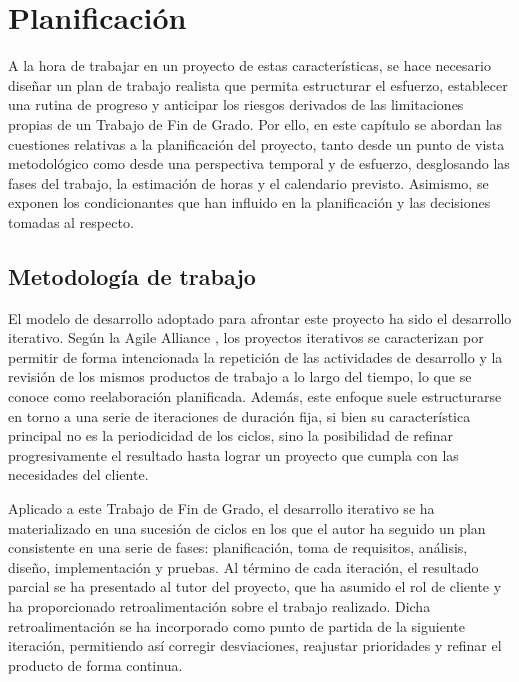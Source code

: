 \chapter{Planificación}

A la hora de trabajar en un proyecto de estas características, se hace necesario diseñar un plan de trabajo realista que permita estructurar el esfuerzo, establecer una rutina de progreso y anticipar los riesgos derivados de las limitaciones propias de un Trabajo de Fin de Grado. Por ello, en este capítulo se abordan las cuestiones relativas a la planificación del proyecto, tanto desde un punto de vista metodológico como desde una perspectiva temporal y de esfuerzo, desglosando las fases del trabajo, la estimación de horas y el calendario previsto. Asimismo, se exponen los condicionantes que han influido en la planificación y las decisiones tomadas al respecto.

\section{Metodología de trabajo}
\label{sec:metodologia}

El modelo de desarrollo adoptado para afrontar este proyecto ha sido el desarrollo iterativo. Según la Agile Alliance \parencite{agilealliance_iterative}, los proyectos iterativos se caracterizan por permitir de forma intencionada la repetición de las actividades de desarrollo y la revisión de los mismos productos de trabajo a lo largo del tiempo, lo que se conoce como reelaboración planificada. Además, este enfoque suele estructurarse en torno a una serie de iteraciones de duración fija, si bien su característica principal no es la periodicidad de los ciclos, sino la posibilidad de refinar progresivamente el resultado hasta lograr un proyecto que cumpla con las necesidades del cliente.

Aplicado a este Trabajo de Fin de Grado, el desarrollo iterativo se ha materializado en una sucesión de ciclos en los que el autor ha seguido un plan consistente en una serie de fases: planificación, toma de requisitos, análisis, diseño, implementación y pruebas. Al término de cada iteración, el resultado parcial se ha presentado al tutor del proyecto, que ha asumido el rol de cliente y ha proporcionado retroalimentación sobre el trabajo realizado. Dicha retroalimentación se ha incorporado como punto de partida de la siguiente iteración, permitiendo así corregir desviaciones, reajustar prioridades y refinar el producto de forma continua.

